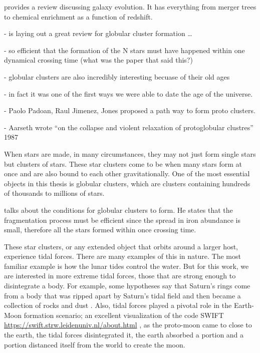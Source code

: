     \citep{2015ARA&A..53...51S} provides a review discussing galaxy evolution. It has everything from merger trees to chemical enrichment as a function of redshift.  


    -   \citet{2025arXiv250116438K} is laying out a great review for globular cluster formation \dots

    - so efficient that the formation of the N stars must have happened within one dynamical crossing time (what was the paper that said this?)

    - globular clusters are also incredibly interesting becuase of their old ages 

    - in fact it was one of the first ways we were able to date the age of the universe. 

    - Paolo Padoan, Raul Jimenez, Jones proposed a path way to form proto clusters. 

    - Aarseth wrote ``on the collapse and violent relaxation of protoglobular clustres'' 1987

    When stars are made, in many circumstances, they may not just form single stars but clusters of stars. These star clusters come to be when many stars form at once and are also bound to each other gravitationally. One of the most essential objects in this thesis is globular clusters, which are clusters containing hundreds of thousands to millions of stars. 

    \citet{1988ApJ...324..288A} talks about the conditions for globular clusters to form. He states that the fragmentation process must be efficient since the spread in iron abundance is small, therefore all the stars formed within once crossing time. 


    These star clusters, or any extended object that orbits around a larger host, experience tidal forces. There are many examples of this in nature. The most familiar example is how the lunar tides control the water. But for this work, we are interested in more extreme tidal forces, those that are strong enough to disintegrate a body. For example, some hypotheses say that Saturn's rings come from a body that was ripped apart by Saturn's tidal field and then became a collection of rocks and dust \citep{2009Icar..199..413C}. Also, tidal forces played a pivotal role in the Earth-Moon formation scenario; an excellent visualization of the  code SWIFT \url{https://swift.strw.leidenuniv.nl/about.html} \citep{2024MNRAS.530.2378S}, as the proto-moon came to close to the earth, the tidal forces disintegrated it, the earth absorbed a portion and a portion distanced itself from the world to create the moon.


